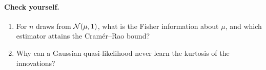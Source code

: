 \paragraph{Check yourself.}
\begin{enumerate}[label=\thesection.\arabic*,leftmargin=2.2em]
\item For $n$ draws from $\mathcal{N}(\mu,1)$, what is the Fisher information about $\mu$, and which estimator attains the
  Cram\'er--Rao bound?
\item Why can a Gaussian quasi-likelihood never learn the kurtosis of the innovations?
\end{enumerate}
